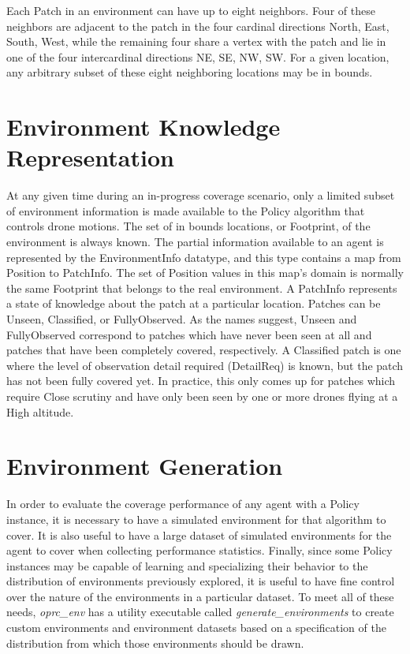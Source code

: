 Each Patch in an environment can have up to eight neighbors. Four of these neighbors are adjacent to the patch in the four cardinal directions {North, East, South, West}, while the remaining four share a vertex with the patch and lie in one of the four intercardinal directions {NE, SE, NW, SW}. For a given location, any arbitrary subset of these eight neighboring locations may be in bounds.

\section{Environment Knowledge Representation}

At any given time during an in-progress coverage scenario, only a limited subset of environment information is made available to the Policy algorithm that controls drone motions. The set of in bounds locations, or Footprint, of the environment is always known. The partial information available to an agent is represented by the EnvironmentInfo datatype, and this type contains a map from Position to PatchInfo. The set of Position values in this map's domain is normally the same Footprint that belongs to the real environment. A PatchInfo represents a state of knowledge about the patch at a particular location. Patches can be Unseen, Classified, or FullyObserved. As the names suggest, Unseen and FullyObserved correspond to patches which have never been seen at all and patches that have been completely covered, respectively. A Classified patch is one where the level of observation detail required (DetailReq) is known, but the patch has not been fully covered yet. In practice, this only comes up for patches which require Close scrutiny and have only been seen by one or more drones flying at a High altitude.

\section{Environment Generation}

In order to evaluate the coverage performance of any agent with a Policy instance, it is necessary to have a simulated environment for that algorithm to cover. It is also useful to have a large dataset of simulated environments for the agent to cover when collecting performance statistics. Finally, since some Policy instances may be capable of learning and specializing their behavior to the distribution of environments previously explored, it is useful to have fine control over the nature of the environments in a particular dataset. To meet all of these needs, \textit{oprc\_env} has a utility executable called \textit{generate\_environments} to create custom environments and environment datasets based on a specification of the distribution from which those environments should be drawn.


